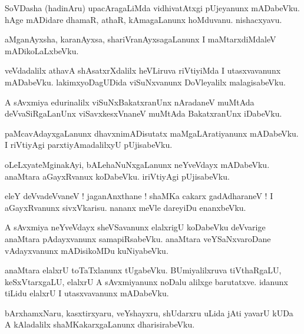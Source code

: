 \documentclass{article}
\begin{document}
\begin{mn}%
SoVDasha (hadinAru) upacAragaLiMda vidhivatAtxgi pUjeyanunx mADabeVku. hAge mADidare dhamaR, athaR, 
kAmagaLanunx hoMduvanu. nishacxyavu.
\end{mn}

\begin{mn}%
aMganAyxsha, karanAyxsa, shariVranAyxsagaLanunx I maMtarxdiMdaleV mADikoLaLxbeVku.
\end{mn}

\begin{mn}%
veVdadalilx athavA shAsatxrXdalilx heVLiruva riVtiyiMda I utasxvavanunx mADabeVku. lakimxyoDagUDida 
viSuNxvanunx DoVleyalilx malagisabeVku.
\end{mn}

\begin{mn}%
A sAvxmiya edurinalilx viSuNxBakatxranUnx nAradaneV muMtAda deVvaSiRgaLanUnx viSavxkesxVnaneV 
muMtAda BakatxranUnx iDabeVku.
\end{mn}

\begin{mn}%
paMcavAdayxgaLanunx dhavxnimADisutatx maMgaLAratiyanunx mADabeVku. I riVtiyAgi parxtiyAmadalilxyU 
pUjisabeVku.
\end{mn}

\begin{mn}%
oLeLxyateMginakAyi, bALehaNuNxgaLanunx neYveVdayx mADabeVku. anaMtara aGayxRvanux koDabeVku. 
iriVtiyAgi pUjisabeVku.
\end{mn}

\begin{mn}%
eleY deVvadeVvaneV ! jaganAnxthane ! shaMKa cakarx gadAdharaneV ! I aGayxRvanunx sivxVkarisu. 
nananx meVle dareyiDu enanxbeVku.
\end{mn}

\begin{mn}%
A sAvxmiya neYveVdayx sheVSavanunx elalxrigU koDabeVku deVvarige anaMtara pAdayxvanunx 
samapiRsabeVku. anaMtara veYSaNxvaroDane vAdayxvanunx mADisikoMDu kuNiyabeVku.
\end{mn}

\begin{mn}%
anaMtara elalxrU toTaTxlanunx tUgabeVku. BUmiyalilxruva tiVthaRgaLU, keSxVtarxgaLU, elalxrU A 
sAvxmiyanunx noDalu alilxge barutatxve. idanunx tiLidu elalxrU I utasxvavanunx mADabeVku.
\end{mn}

\begin{mn}%
bArxhamxNaru, kasxtirxyaru, veYshayxru, shUdarxru uLida jAti yavarU kUDa A kAladalilx 
shaMKakarxgaLanunx dharisirabeVku.
\end{mn}
\end{document}

